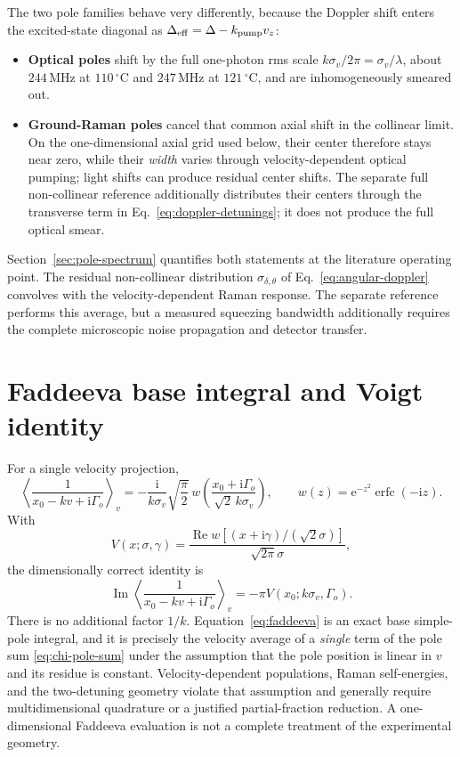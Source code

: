 \documentclass[11pt,a4paper]{article}
\newcommand{\ii}{\mathrm i}
\newcommand{\e}{\mathrm e}
\newcommand{\Rea}{\operatorname{Re}}
\newcommand{\Ima}{\operatorname{Im}}
\newcommand{\MHz}{\,\mathrm{MHz}}
\newcommand{\degC}{\,^{\circ}\mathrm C}
\begin{document}
The two pole families behave very differently, because the Doppler shift
enters the excited-state diagonal as $\Delta_{\rm eff}=\Delta-k_{\rm pump}v_z$:
\begin{itemize}
\item \textbf{Optical poles} shift by the full one-photon rms scale
$k\sigma_v/2\pi=\sigma_v/\lambda$, about $244\MHz$ at $110\degC$ and
$247\MHz$ at $121\degC$, and are inhomogeneously smeared out.
\item \textbf{Ground-Raman poles} cancel that common axial shift in the
collinear limit. On the one-dimensional axial grid used below, their center
therefore stays near zero, while their \emph{width} varies through
velocity-dependent optical pumping; light shifts can produce residual center
shifts. The separate full non-collinear reference additionally distributes
their centers through the transverse term in
Eq.~\eqref{eq:doppler-detunings}; it does not produce the full optical smear.
\end{itemize}
Section~\ref{sec:pole-spectrum} quantifies both statements at the literature
operating point. The residual non-collinear distribution
$\sigma_{\delta,\theta}$ of Eq.~\eqref{eq:angular-doppler} convolves with the
velocity-dependent Raman response. The separate reference performs this
average, but a measured squeezing bandwidth additionally requires the complete microscopic
noise propagation and detector transfer.

\section{Faddeeva base integral and Voigt identity}

For a single velocity projection,
\begin{equation}
\left\langle\frac1{x_0-kv+\ii\Gamma_o}\right\rangle_v
=-\frac{\ii}{k\sigma_v}\sqrt{\frac{\pi}{2}}\,
w\!\left(\frac{x_0+\ii\Gamma_o}{\sqrt2\,k\sigma_v}\right),
\qquad
w(z)=\e^{-z^2}\operatorname{erfc}(-\ii z).
\label{eq:faddeeva}
\end{equation}
With
\[
V(x;\sigma,\gamma)=
\frac{\Rea w[(x+\ii\gamma)/(\sqrt2\sigma)]}
{\sqrt{2\pi}\sigma},
\]
the dimensionally correct identity is
\begin{equation}
\boxed{\;
\Ima\left\langle\frac1{x_0-kv+\ii\Gamma_o}\right\rangle_v
=-\pi V(x_0;k\sigma_v,\Gamma_o).\;}
\label{eq:voigt-correct}
\end{equation}
There is no additional factor $1/k$. Equation~\eqref{eq:faddeeva} is an exact
base simple-pole integral, and it is precisely the velocity average of a
\emph{single} term of the pole sum \eqref{eq:chi-pole-sum} under the
assumption that the pole position is linear in $v$ and its residue is
constant. Velocity-dependent populations, Raman self-energies, and the
two-detuning geometry violate that assumption and generally require
multidimensional quadrature or a justified partial-fraction reduction. A
one-dimensional Faddeeva evaluation is not a complete treatment of the
experimental geometry.
\end{document}
